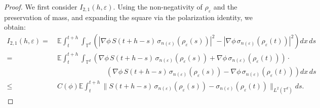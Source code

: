 \documentclass[10pt,a4paper]{amsart}
\def\leq{\leqslant}
\begin{document}
\begin{proof}
We first consider $I_{2,1}(h,\varepsilon)$. Using the non-negativity of $\rho_{\varepsilon}$ and the preservation of mass, and expanding the square via the polarization identity, we obtain:
\begin{align*}
I_{2,1}(h,\varepsilon) 
=&\ \mathbb{E} \int_t^{t+h} \int_{\mathbb{T}^d} \left( 
|\nabla\phi\, S(t+h - s)\, \sigma_{n(\varepsilon)}(\rho_{\varepsilon}(s))|^2 
- |\nabla\phi\, \sigma_{n(\varepsilon)}(\rho_{\varepsilon}(t))|^2 
\right) dx\, ds \\
=&\ \mathbb{E} \int_t^{t+h} \int_{\mathbb{T}^d} \left( 
\nabla\phi\, S(t+h - s)\, \sigma_{n(\varepsilon)}(\rho_{\varepsilon}(s)) 
+ \nabla\phi\, \sigma_{n(\varepsilon)}(\rho_{\varepsilon}(t)) 
\right) \cdot \\
&\hspace{3cm} \left( 
\nabla\phi\, S(t+h - s)\, \sigma_{n(\varepsilon)}(\rho_{\varepsilon}(s)) 
- \nabla\phi\, \sigma_{n(\varepsilon)}(\rho_{\varepsilon}(t)) 
\right) dx\, ds \\
\leq&\ C(\phi) \mathbb{E} \int_t^{t+h} \| S(t+h - s)\, \sigma_{n(\varepsilon)}(\rho_{\varepsilon}(s)) 
- \sigma_{n(\varepsilon)}(\rho_{\varepsilon}(t)) \|_{L^2(\mathbb{T}^d)} ds.
\end{align*}


\end{proof}
\end{document}
